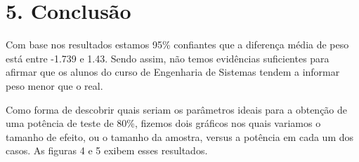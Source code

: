 \documentclass[]{article}
\newenvironment{Shaded}{\begin{snugshade}}{\end{snugshade}}
\newcommand{\KeywordTok}[1]{\textcolor[rgb]{0.13,0.29,0.53}{\textbf{{#1}}}}
\newcommand{\DataTypeTok}[1]{\textcolor[rgb]{0.13,0.29,0.53}{{#1}}}
\newcommand{\DecValTok}[1]{\textcolor[rgb]{0.00,0.00,0.81}{{#1}}}
\newcommand{\FloatTok}[1]{\textcolor[rgb]{0.00,0.00,0.81}{{#1}}}
\newcommand{\StringTok}[1]{\textcolor[rgb]{0.31,0.60,0.02}{{#1}}}
\newcommand{\CommentTok}[1]{\textcolor[rgb]{0.56,0.35,0.01}{\textit{{#1}}}}
\newcommand{\OtherTok}[1]{\textcolor[rgb]{0.56,0.35,0.01}{{#1}}}
\newcommand{\NormalTok}[1]{{#1}}
\begin{document}
\section{5. Conclusão}\label{conclusao}

\quad Com base nos resultados estamos 95\% confiantes que a diferença
média de peso está entre -1.739 e 1.43. Sendo assim, não temos
evidências suficientes para afirmar que os alunos do curso de Engenharia
de Sistemas tendem a informar peso menor que o real.

\quad Como forma de descobrir quais seriam os parâmetros ideais para a
obtenção de uma potência de teste de 80\%, fizemos dois gráficos nos
quais variamos o tamanho de efeito, ou o tamanho da amostra, versus a
potência em cada um dos casos. As figuras 4 e 5 exibem esses resultados.

\begin{Shaded}
\end{Shaded}
\end{document}
